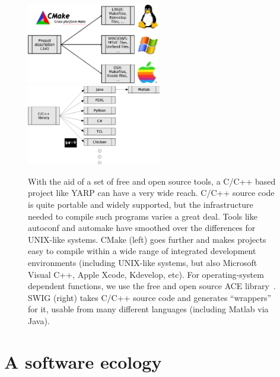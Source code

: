 

\begin{figure}[t]
\begin{center}
\includegraphics[height=3.5cm]{fig-cmake}
\ \ \ \ \ \ 
\includegraphics[height=3.5cm]{fig-swig}
\caption{
%
\label{fig:build}
%
With the aid of a set of free and open source tools, 
a C/C++ based project like YARP can have a very
wide reach.
%
C/C++ source code is quite portable and widely supported, but the
infrastructure needed to compile such programs varies a great 
deal.  Tools like autoconf and automake have smoothed over
the differences for UNIX-like systems. CMake (left) goes
further and makes projects easy to compile within a
wide range of integrated development environments
(including UNIX-like systems, but also Microsoft Visual C++,
Apple Xcode, Kdevelop, etc).
%
For operating-system dependent functions, we use the free
and open source ACE library~\cite{ACEBook}.
%
SWIG (right) takes C/C++ source code and generates ``wrappers''
for it, usable from many different languages (including Matlab
via Java).
%
%
}
\end{center}
\end{figure}


\section{A software ecology}




